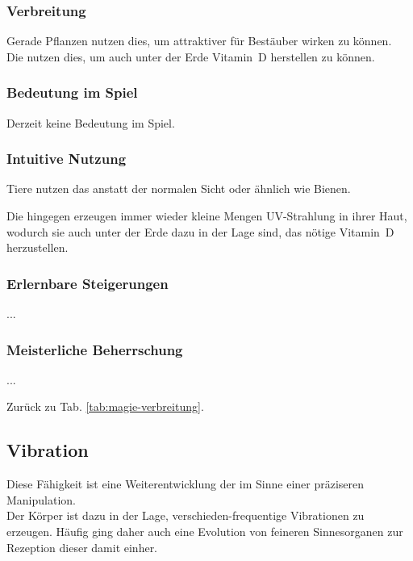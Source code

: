 \subsubsection{Verbreitung}
Gerade Pflanzen nutzen dies, um attraktiver für Bestäuber wirken zu können. \\
Die  nutzen dies, um auch unter der Erde Vitamin~D herstellen zu können.

\subsubsection{Bedeutung im Spiel}
Derzeit keine Bedeutung im Spiel.

\subsubsection{Intuitive Nutzung}
Tiere nutzen das \zB anstatt der normalen Sicht oder ähnlich wie Bienen.

Die  hingegen erzeugen immer wieder kleine Mengen UV-Strahlung in ihrer Haut, wodurch sie auch unter der Erde dazu in der Lage sind, das nötige Vitamin~D herzustellen.

\subsubsection{Erlernbare Steigerungen}
\begin{outline}
	\1 ...
\end{outline}

\subsubsection{Meisterliche Beherrschung} 
\begin{outline}
	\1 ...
\end{outline}
Zurück zu Tab. \ref{tab:magie-verbreitung}.



\subsection{Vibration}\label{sec:vibrationsmagie}
Diese Fähigkeit ist eine Weiterentwicklung der  im Sinne einer präziseren Manipulation.\\
Der Körper ist dazu in der Lage, verschieden-frequentige Vibrationen zu erzeugen. 
Häufig ging daher auch eine Evolution von feineren Sinnesorganen zur Rezeption dieser damit einher.

